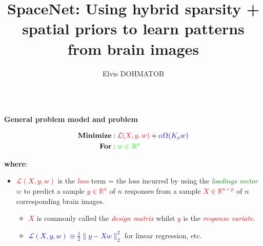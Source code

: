 \documentclass[french]{STIC_poster}
\title{SpaceNet: Using hybrid sparsity + spatial priors to learn patterns from brain images}			%
\author{Elvis DOHMATOB}						%
\begin{document}
	\begin{frame}[t]
		\begin{columns}[t]
			\hfill
			\begin{column}{.48\linewidth}
				\begin{sxbox}[\textwidth]{\textbf{General problem model and problem}}
                                  \begin{notitlebox}[\textwidth]
                                    \begin{equation}
                                      \begin{split}
                                        \textbf{Minimize} &: \textcolor{red}{\mathcal{L}(X,y,w)} + \textcolor{blue}{\alpha \Omega(K_{\rho}w)}\\
                                        \textbf{For} &: \textcolor{green}{w\in\mathbb{R}^p}
                                        \label{eq:opt_pb}
                                      \end{split}
                                    \end{equation}
                                  \end{notitlebox}
                                  \textbf{where}:
                                  \begin{itemize}
                                    \item \textcolor{red}{$\mathcal{L}(X,y,w)$} is the \textcolor{red}{\textit{loss}} term = the loss incurred by using the
                                      \textcolor{green}{\textit{loadings vector} $w$} to predict a sample \textcolor{red}{$y\in\mathbb{R}^n$} of $n$
                                      responses from a sample \textcolor{red}{$X\in\mathbb{R}^{n \times p}$} of $n$ corresponding brain images.
                                      \begin{itemize}
                                        \item \textcolor{red}{$X$} is commonly called the \textcolor{red}{\textit{design matrix}} whilst \textcolor{red}{$y$}
                                          is the \textcolor{red}{\textit{response variate}}. \item \textcolor{blue}{$\mathcal{L}(X,y,w) \equiv \frac{1}{2}\|y-Xw\|_2^2$} for linear regression, etc.

\end{itemize}
\end{itemize}
\end{sxbox}
\end{column}
\end{columns}
\end{frame}
\end{document}
